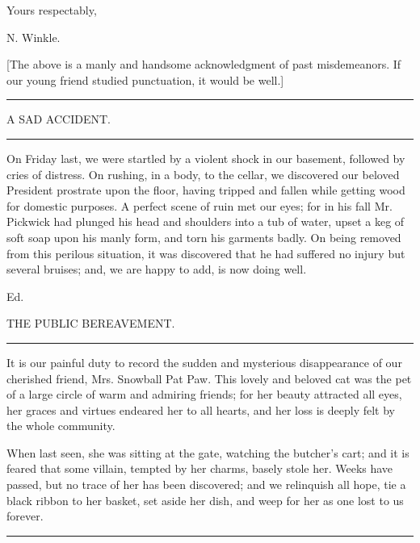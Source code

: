 Yours respectably,

N. Winkle.

{[}The above is a manly and handsome acknowledgment of past
misdemeanors. If our young friend studied punctuation, it would be
well.{]}

\begin{center}\rule{0.5\linewidth}{0.5pt}\end{center}

A SAD ACCIDENT.

\begin{center}\rule{0.5\linewidth}{0.5pt}\end{center}

On Friday last, we were startled by a violent shock in our basement,
followed by cries of distress. On rushing, in a body, to the cellar, we
discovered our beloved President prostrate upon the floor, having
tripped and fallen while getting wood for domestic purposes. A perfect
scene of ruin met our eyes; for in his fall Mr. Pickwick had plunged his
head and shoulders into a tub of water, upset a keg of soft soap upon
his manly form, and torn his garments badly. On being removed from this
perilous situation, it was discovered that he had suffered no injury but
several bruises; and, we are happy to add, is now doing well.

{Ed.}

\hfill\break

THE PUBLIC BEREAVEMENT.

\begin{center}\rule{0.5\linewidth}{0.5pt}\end{center}

It is our painful duty to record the sudden and mysterious disappearance
of our cherished friend, Mrs. Snowball Pat Paw. This lovely and beloved
cat was the pet of a large circle of warm and admiring friends; for her
beauty attracted all eyes, her graces and virtues endeared her to all
hearts, and her loss is deeply felt by the whole community.

When last seen, she was sitting at the gate, watching the
butcher's cart; and it is feared that some villain,
tempted by her charms, basely stole her. Weeks have passed, but no trace
of her has been discovered; and we relinquish all hope, tie a black
ribbon to her basket, set aside her dish, and weep for her as one lost
to us forever.

\begin{center}\rule{0.5\linewidth}{0.5pt}\end{center}

